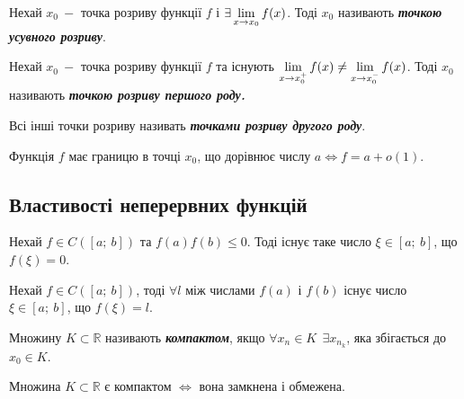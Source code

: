 \begin{definition}
        Нехай $x_0 \: -$ точка розриву функції $f$ і $\exists \displaystyle\lim\limits_{x \to x_0} f(x)$. Тоді $x_0$ називають \textcolor{NavyBlue}{\textbf{\textit{{точкою усувного розриву}}}}.
\end{definition}

\begin{definition}
         Нехай $x_0 \: -$ точка розриву функції $f$ та існують $\displaystyle\lim\limits_{x \to x_0^{+}}f(x) \neq \displaystyle\lim\limits_{x \to x_0^{-}}f(x)$. Тоді $x_0$ називають \textcolor{NavyBlue}{\textbf{\textit{точкою розриву першого роду.}}}
\end{definition}

\begin{definition}
         Всі інші точки розриву називать \textcolor{NavyBlue}{\textbf{\textit{{точками розриву другого роду}}}}.
\end{definition}

\begin{theorem}
       Функція $f$ має границю в точці $x_0$, що дорівнює числу $a \iff f = a + o(1).$      
\end{theorem}

\subsection{\large{Властивості неперервних функцій}} 

\begin{theorem}
       Нехай $f \in C([a; \: b])$ та $f(a) f(b) \leqslant  0$. Тоді існує таке число $\xi \in [a; \: b]$, що $f(\xi) = 0$.
\end{theorem}

\begin{theorem}
       Нехай $f\in C([a ; \: b])$, тоді $\forall l$ між числами \newline $f(a)$ і $f(b)$ існує число $\xi \in [a; \: b]$, що $f(\xi) = l$.
\end{theorem}

\begin{definition}
       Множину $K \subset \mathbb{R}$ називають \textcolor{NavyBlue}{\textbf{\textit{{компактом}}}}, якщо  $\forall x_n \in K  \ \: \exists x_{n_k}$, яка збігається до $x_0 \in K$.
\end{definition}

\begin{theorem}
       Множина $K \subset \mathbb{R}$ є компактом $\iff$ вона замкнена і обмежена.
\end{theorem}
        
